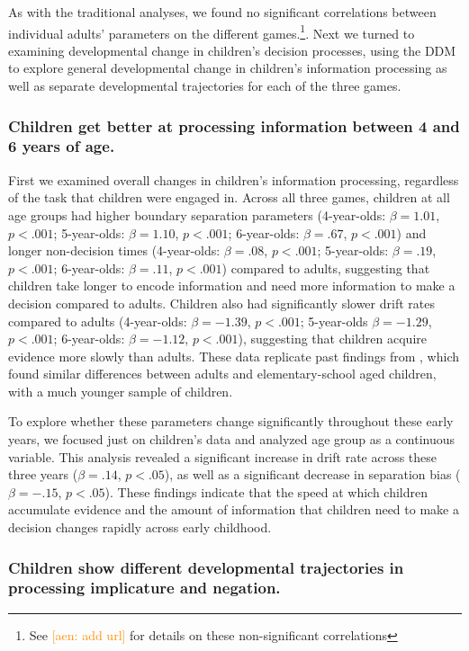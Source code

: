 \documentclass[10pt,letterpaper]{article}
\newcommand{\aen}[1]{\textcolor{DarkOrange}{[aen: #1]}}
\begin{document}
As with the traditional analyses, we found no significant correlations between individual adults' parameters on the different games.\footnote{See \aen{add url} for details on these non-significant correlations}.  Next we turned to examining developmental change in children's decision processes, using the DDM to explore general developmental change in children's information processing as well as separate developmental trajectories for each of the three games.

\subsubsection{Children get better at processing information between 4 and 6 years of age.}

First we examined overall changes in children's information processing, regardless of the task that children were engaged in. Across all three games, children at all age groups had higher boundary separation parameters (4-year-olds: $\beta = 1.01$, $p <.001$; 5-year-olds: $\beta = 1.10$, $p <.001$; 6-year-olds: $\beta = .67$, $p <.001$) and longer non-decision times (4-year-olds: $\beta = .08$, $p <.001$; 5-year-olds: $\beta = .19$, $p <.001$; 6-year-olds: $\beta = .11$, $p <.001$) compared to adults, suggesting that children take longer to encode information and need more information to make a decision compared to adults.  Children also had significantly slower drift rates compared to adults (4-year-olds: $\beta = -1.39$, $p <.001$; 5-year-olds $\beta = -1.29$, $p <.001$; 6-year-olds: $\beta = -1.12$, $p <.001$), suggesting that children acquire evidence more slowly than adults.  These data replicate past findings from , which found similar differences between adults and elementary-school aged children, with a much younger sample of children.  

To explore whether these parameters change significantly throughout these early years, we focused just on children's data and analyzed age group as a continuous variable.  This analysis revealed a significant increase in drift rate across these three years ($\beta = .14$, $p < .05$), as well as a significant decrease in separation bias ($\beta = -.15$, $p < .05$).  These findings indicate that the speed at which children accumulate evidence and the amount of information that children need to make a decision changes rapidly across early childhood.  

\subsubsection{Children show different developmental trajectories in processing implicature and negation.}
\end{document}
